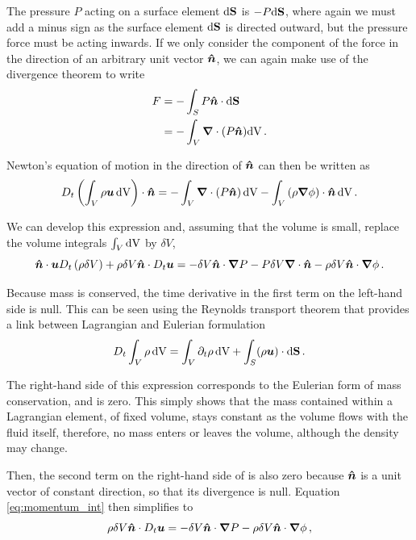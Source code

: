 The pressure \(P\) acting on a surface element \(\updvec{S}\) is \(-P\updvec{S}\), where again we must add a minus sign as the surface element \(\updvec{S}\) is directed outward, but the pressure force must be acting inwards. If we only consider the component of the force in the direction of an arbitrary unit vector \(\unitvec{n}\), we can again make use of the divergence theorem to write
\begin{align}
    F & = - \int_S P \unitvec{n} \cdot \updvec{S} \nonumber \\
      & = - \int_V \nablavec \cdot (P\unitvec{n}) \upd[V] \punct{.}
\end{align}

Newton's equation of motion in the direction of \(\unitvec{n}\) can then be written as
\begin{equation}
    D_t \left( \int_V \rho \fvec{u} \,\upd[V] \right) \cdot \unitvec{n} = - \int_V \nablavec \cdot \left( P\unitvec{n} \right) \upd[V] - \int_V \left( \rho \nablavec \phi \right) \cdot \unitvec{n} \,\upd[V] \punct{.}
\end{equation}

We can develop this expression and, assuming that the volume is small, replace the volume integrals \(\int_V \upd[V]\) by \(\delta V\),
\begin{equation}
    \unitvec{n} \cdot \fvec{u} D_t \left( \rho \delta V \right) + \rho \delta V \unitvec{n} \cdot D_t \fvec{u} = - \delta V \unitvec{n} \cdot \nablavec P - P \delta V \nablavec \cdot \unitvec{n} - \rho \delta V \unitvec{n} \cdot \nablavec \phi \punct{.} \label{eq:momentum_int}
\end{equation}

Because mass is conserved, the time derivative in the first term on the left-hand side is null. This can be seen using the Reynolds transport theorem that provides a link between Lagrangian and Eulerian formulation
\begin{equation}
    D_t \int_V \rho \,\upd[V] = \int_V \partial_t \rho \,\upd[V] + \int_S (\rho \fvec{u}) \cdot \updvec{S} \punct{.}
\end{equation}

The right-hand side of this expression corresponds to the Eulerian form of mass conservation, and is zero. This simply shows that the mass contained within a Lagrangian element, of fixed volume, stays constant as the volume flows with the fluid itself, therefore, no mass enters or leaves the volume, although the density may change.

Then, the second term on the right-hand side of  is also zero because \(\unitvec{n}\) is a unit vector of constant direction, so that its divergence is null. Equation \ref{eq:momentum_int} then simplifies to
\begin{equation}
    \rho \delta V \unitvec{n} \cdot D_t \fvec{u} = - \delta V \unitvec{n} \cdot \nablavec P - \rho \delta V \unitvec{n} \cdot \nablavec \phi \punct{,}
\end{equation}

